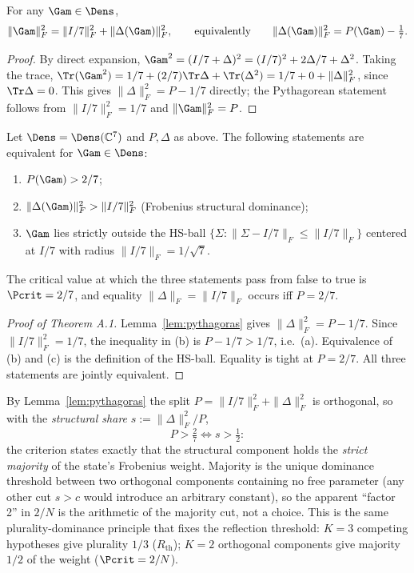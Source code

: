 \begin{lemma}\label{lem:pythagoras}
For any $\Gam \in \Dens$,
\[
  \|\Gam\|_F^2 = \|I/7\|_F^2 + \|\Delta(\Gam)\|_F^2,
  \qquad
  \text{equivalently}\qquad
  \|\Delta(\Gam)\|_F^2 = P(\Gam) - \tfrac{1}{7}.
\]
\end{lemma}

\begin{proof}
By direct expansion,
$\Gam^2 = (I/7 + \Delta)^2 = (I/7)^2 + 2\Delta/7 + \Delta^2$.
Taking the trace, $\Tr(\Gam^2) = 1/7 + (2/7)\Tr\Delta + \Tr(\Delta^2)
= 1/7 + 0 + \|\Delta\|_F^2$, since $\Tr\Delta = 0$.
This gives $\|\Delta\|_F^2 = P - 1/7$ directly; the Pythagorean statement
follows from $\|I/7\|_F^2 = 1/7$ and $\|\Gam\|_F^2 = P$.
\end{proof}

\begin{theorembox}[{Theorem~A.1 (Critical purity, N=7)}]
Let $\Dens = \Dens(\mathbb{C}^7)$ and $P, \Delta$ as above. The following
statements are equivalent for $\Gam \in \Dens$:
\begin{enumerate}[leftmargin=2em,label=(\alph*)]
  \item $P(\Gam) > 2/7$;
  \item $\|\Delta(\Gam)\|_F^2 > \|I/7\|_F^2$ \hfill(Frobenius structural dominance);
  \item $\Gam$ lies strictly outside the HS-ball $\{\Sigma : \|\Sigma - I/7\|_F \leq \|I/7\|_F\}$
        centered at $I/7$ with radius $\|I/7\|_F = 1/\sqrt 7$.
\end{enumerate}
The critical value at which the three statements pass from false to true is
$\Pcrit = 2/7$, and equality $\|\Delta\|_F = \|I/7\|_F$ occurs iff $P = 2/7$.
\end{theorembox}

\begin{proof}[Proof of Theorem A.1]
Lemma~\ref{lem:pythagoras} gives $\|\Delta\|_F^2 = P - 1/7$. Since
$\|I/7\|_F^2 = 1/7$, the inequality in (b) is
$P - 1/7 > 1/7$, i.e.\ (a). Equivalence of (b) and (c) is the definition of
the HS-ball. Equality is tight at $P = 2/7$. All three statements are jointly
equivalent.
\end{proof}

\begin{corollary}\label{cor:majority}
By Lemma~\ref{lem:pythagoras} the split $P = \|I/7\|_F^2 + \|\Delta\|_F^2$ is
orthogonal, so with the \emph{structural share} $s := \|\Delta\|_F^2/P$,
\[
  P > \tfrac{2}{7} \iff s > \tfrac{1}{2}:
\]
the criterion states exactly that the structural component holds the
\emph{strict majority} of the state's Frobenius weight. Majority is the unique
dominance threshold between two orthogonal components containing no free
parameter (any other cut $s > c$ would introduce an arbitrary constant), so the
apparent ``factor 2'' in $2/N$ is the arithmetic of the majority cut, not a
choice. This is the same plurality-dominance principle that fixes the
reflection threshold: $K = 3$ competing hypotheses give plurality $1/3$
($R_{\mathrm{th}}$); $K = 2$ orthogonal components give majority $1/2$ of the
weight ($\Pcrit = 2/N$).
\end{corollary}

